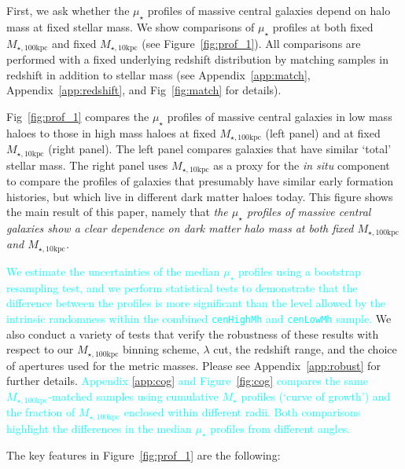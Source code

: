 \documentclass[a4paper,fleqn,usenatbib]{mnras}
\def\rbcg{\texttt{cenHighMh}}
\def\nbcg{\texttt{cenLowMh}}
\def\mstar{{$M_{\star}$}}
\def\minn{{$M_{\star,10\mathrm{kpc}}$}}
\def\mtot{{$M_{\star,100\mathrm{kpc}}$}}
\def\mden{{$\mu_{\star}$}}
\newcommand{\song}[1]{\textcolor{cyan}{#1}}
\begin{document}
    First, we ask whether the \mden{} profiles of massive central galaxies depend on 
    halo mass at fixed stellar mass.    
    We show comparisons of \mden{} profiles at both fixed \mtot{} and fixed 
    \minn{} (see Figure~\ref{fig:prof_1}). 
    All comparisons are performed with a fixed underlying redshift
    distribution by matching samples in redshift in addition to stellar mass
    (see Appendix~\ref{app:match}, Appendix~\ref{app:redshift}, 
    and Fig~\ref{fig:match} for details). 
   
    Fig~\ref{fig:prof_1} compares the \mden{} profiles of massive central galaxies in 
    low mass haloes to those in high mass haloes at fixed \mtot{} (left panel) and at 
    fixed \minn{} (right panel). 
    The left panel compares galaxies that have similar `total' stellar mass. 
    The right panel uses \minn{} as a proxy for the \textit{in situ} component to 
    compare the profiles of galaxies that presumably have similar early formation 
    histories, but which live in different dark matter haloes today.
    This figure shows the main result of this paper, namely that \emph{the \mden{} 
    profiles of massive central galaxies show a clear dependence on dark matter halo 
    mass at both fixed \mtot{} and \minn{}.}

    \song{
    We estimate the uncertainties of the median \mden{} profiles using a bootstrap 
    resampling test, and we perform statistical tests to demonstrate that the 
    difference between the profiles is more significant than the level allowed by 
    the intrinsic randomness within the combined \rbcg{} and \nbcg{} sample. 
    }
    We also conduct a variety of tests that verify the robustness of these results with
    respect to our \mtot{} binning scheme, $\lambda$ cut, the redshift range, and the 
    choice of apertures used for the metric masses. 
    Please see Appendix~\ref{app:robust} for further details.
    \song{Appendix \ref{app:cog} and Figure~\ref{fig:cog} compares the same 
    \mtot{}-matched samples using cumulative \mstar{} profiles (`curve of growth') 
    and the fraction of \mtot{} enclosed within different radii.
    Both comparisons highlight the differences in the median \mden{} profiles 
    from different angles.   
    }
   
    The key features in Figure~\ref{fig:prof_1} are the following:
    
\end{document}

